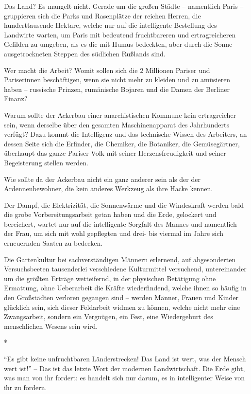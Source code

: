 \documentclass{scrbook}
\begin{document}
Das Land? Es mangelt nicht. Gerade um die großen Städte – namentlich Paris – gruppieren sich die Parks und Rasenplätze der reichen Herren, die hunderttausende Hektare, welche nur auf die intelligente Bestellung des Landwirte warten, um Paris mit bedeutend fruchtbareren und ertragreicheren Gefilden zu umgeben, als es die mit Humus bedeckten, aber durch die Sonne ausgetrockneten Steppen des südlichen Rußlands sind.

Wer macht die Arbeit? Womit sollen sich die 2 Millionen Pariser und Pariserinnen beschäftigen, wenn sie nicht mehr zu kleiden und zu amüsieren haben – russische Prinzen, rumänische Bojaren und die Damen der Berliner Finanz?

Warum sollte der Ackerbau einer anarchistischen Kommune kein ertragreicher sein, wenn derselbe über den gesamten Maschinenapparat des Jahrhunderts verfügt? Dazu kommt die Intelligenz und das technische Wissen des Arbeiters, an dessen Seite sich die Erfinder, die Chemiker, die Botaniker, die Gemüsegärtner, überhaupt das ganze Pariser Volk mit seiner Herzensfreudigkeit und seiner Begeisterung stellen werden.

Wie sollte da der Ackerbau nicht ein ganz anderer sein als der der Ardennenbewohner, die kein anderes Werkzeug als ihre Hacke kennen.

Der Dampf, die Elektrizität, die Sonnenwärme und die Windeskraft werden bald die grobe Vorbereitungsarbeit getan haben und die Erde, gelockert und bereichert, wartet nur auf die intelligente Sorgfalt des Mannes und namentlich der Frau, um sich mit wohl gepflegten und drei- bis viermal im Jahre sich erneuernden Saaten zu bedecken.

Die Gartenkultur bei sachverständigen Männern erlernend, auf abgesonderten Versuchsbeeten tausenderlei verschiedene Kulturmittel versuchend, untereinander um die größten Erträge wetteifernd, in der physischen Betätigung ohne Ermattung, ohne Ueberarbeit die Kräfte wiederfindend, welche ihnen so häufig in den Großstädten verloren gegangen sind – werden Männer, Frauen und Kinder glücklich sein, sich dieser Feldarbeit widmen zu können, welche nicht mehr eine Zwangsarbeit, sondern ein Vergnügen, ein Fest, eine Wiedergeburt des menschlichen Wesens sein wird.

\begin{center}*\end{center}

``Es gibt keine unfruchtbaren Länderstrecken! Das Land ist wert, was der Mensch wert ist!'' – Das ist das letzte Wort der modernen Landwirtschaft. Die Erde gibt, was man von ihr fordert: es handelt sich nur darum, es in intelligenter Weise von ihr zu fordern.
\end{document}
